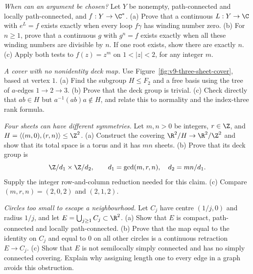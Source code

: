 \begin{exercise}[$\star\star$]\label{ex:v9-logarithms-roots}
\emph{When can an argument be chosen?} Let $Y$ be nonempty, path-connected and locally path-connected, and $f:Y\to\C^*$. (a) Prove that a continuous $L:Y\to\C$ with $e^L=f$ exists exactly when every loop $f\gamma$ has winding number zero. (b) For $n\ge1$, prove that a continuous $g$ with $g^n=f$ exists exactly when all these winding numbers are divisible by $n$. If one root exists, show there are exactly $n$. (c) Apply both tests to $f(z)=z^m$ on $1<|z|<2$, for any integer $m$.
\end{exercise}

\begin{exercise}[$\star\star$]\label{ex:v9-three-sheet-cover}
\emph{A cover with no nonidentity deck map.} Use Figure~\ref{fig:v9-three-sheet-cover}, based at vertex $1$. (a) Find the subgroup $H\le F_2$ and a free basis using the tree of $a$-edges $1\to2\to3$. (b) Prove that the deck group is trivial. (c) Check directly that $ab\in H$ but $a^{-1}(ab)a\notin H$, and relate this to normality and the index-three rank formula.
\end{exercise}

\begin{exercise}[$\star\star$]\label{ex:v9-torus-cover-lattice}
\emph{Four sheets can have different symmetries.} Let $m,n>0$ be integers, $r\in\Z$, and $H=\langle(m,0),(r,n)\rangle\le\Z^2$. (a) Construct the covering $\R^2/H\to\R^2/\Z^2$ and show that its total space is a torus and it has $mn$ sheets. (b) Prove that its deck group is
\[
\Z/d_1\times\Z/d_2,\qquad d_1=\gcd(m,r,n),\quad d_2=mn/d_1.
\]
Supply the integer row-and-column reduction needed for this claim. (c) Compare $(m,r,n)=(2,0,2)$ and $(2,1,2)$.
\end{exercise}

\begin{exercise}[$\star\star\star$]\label{ex:v9-shrinking-circles}
\emph{Circles too small to escape a neighbourhood.} Let $C_j$ have centre $(1/j,0)$ and radius $1/j$, and let $E=\bigcup_{j\ge1}C_j\subset\R^2$. (a) Show that $E$ is compact, path-connected and locally path-connected. (b) Prove that the map equal to the identity on $C_j$ and equal to $0$ on all other circles is a continuous retraction $E\to C_j$. (c) Show that $E$ is not semilocally simply connected and has no simply connected covering. Explain why assigning length one to every edge in a graph avoids this obstruction.
\end{exercise}

